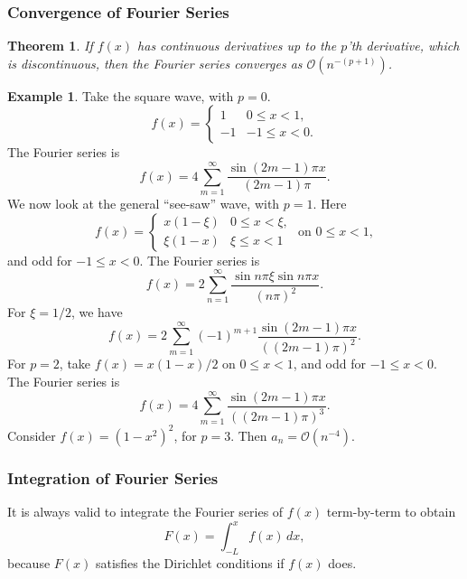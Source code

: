 \documentclass[12pt]{article}
\newtheorem{theorem}{Theorem}[section]
\theoremstyle{definition}
\newtheorem{example}{Example}[section]
\theoremstyle{remark}
\begin{document}
\subsubsection{Convergence of Fourier Series}%
\label{subsub:convergence_of_fourier_series}

\begin{theorem}
	If $f(x)$ has continuous derivatives up to the $p$'th derivative, which is discontinuous, then the Fourier series converges as $\mathcal{O}(n^{-(p+1)})$.
\end{theorem}

\begin{adjustbox}{minipage = \columnwidth - 25.5pt, margin=1em, frame=1pt, margin=0em}
\begin{example}
	Take the square wave, with $p = 0$.
	\[
		f(x) =
		\begin{cases}
			1 & 0 \leq x < 1, \\
			-1 & -1 \leq x < 0.
		\end{cases}
	\]
	The Fourier series is
	\[
		f(x) = 4 \sum_{m = 1}^{\infty} \frac{\sin (2m - 1) \pi x}{(2m - 1)\pi}
	.\]
	We now look at the general ``see-saw'' wave, with $p = 1$. Here
	\[
		f(x) =
		\begin{cases}
			x(1 - \xi) & 0 \leq x < \xi, \\
			\xi(1 - x) & \xi \leq x < 1
		\end{cases}
		\text{ on } 0 \leq x < 1,
	\]
	and odd for $-1 \leq x < 0$. The Fourier series is
	\[
		f(x) = 2 \sum_{n = 1}^{\infty} \frac{\sin n \pi \xi \sin n \pi x}{(n \pi)^2}
	.\]
	For $\xi = 1/2$, we have
	\[
		f(x) = 2 \sum_{m = 1}^{\infty}(-1)^{m+1} \frac{\sin (2m - 1) \pi x}{((2m - 1)\pi)^2}
	.\]
	For $p = 2$, take $f(x) = x(1-x)/2$ on $0 \leq x < 1$, and odd for $-1 \leq x < 0$. The Fourier series is
	\[
		f(x) = 4 \sum_{m = 1}^{\infty} \frac{\sin (2m - 1) \pi x}{((2m - 1)\pi)^3}
	.\]
	Consider $f(x) = (1 - x^2)^2$, for $p = 3$. Then $a_n = \mathcal{O}(n^{-4})$.
\end{example}

\end{adjustbox}

\subsubsection{Integration of Fourier Series}%
\label{subsub:integration_of_fourier_series}

It is always valid to integrate the Fourier series of $f(x)$ term-by-term to obtain
\[
	F(x) = \int_{-L}^{x} f(x) \, dx
,\]
because $F(x)$ satisfies the Dirichlet conditions if $f(x)$ does.
\end{document}
